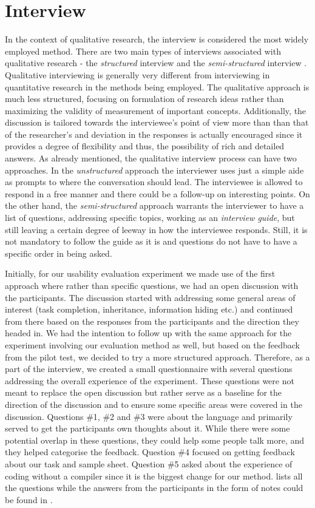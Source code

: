 \section{Interview}
In the context of qualitative research, the interview is considered the most widely employed method. There are two main types of interviews associated with qualitative research - the \textit{structured} interview and the \textit{semi-structured} interview \cite{Bryman}. Qualitative interviewing is generally very different from  interviewing in quantitative research in the methods being employed. The qualitative approach is much less structured, focusing on formulation of research ideas rather than maximizing the validity of measurement of important concepts. Additionally, the discussion is tailored towards the interviewee's point of view more than than that of the researcher's and deviation in the responses is actually encouraged since it provides a degree of flexibility and thus, the possibility of rich and detailed answers. As already mentioned, the qualitative interview process can have two approaches. In the \textit{unstructured} approach the interviewer uses just a simple aide as prompts to where the conversation should lead. The interviewee is allowed to respond in a free manner and there could be a follow-up on interesting points. On the other hand, the \textit{semi-structured} approach warrants the interviewer to have a list of questions, addressing specific topics, working as an \textit{interview guide}, but still leaving a certain degree of leeway in how the interviewee responds. Still, it is not mandatory to follow the guide as it is and questions do not have to have a specific order in being asked. 

Initially, for our usability evaluation experiment we made use of the first approach where rather than specific questions, we had an open discussion with the participants. The discussion started with addressing some general areas of interest (task completion, inheritance, information hiding etc.) and continued from there based on the responses from the participants and the direction they headed in. We had the intention to follow up with the same approach for the experiment involving our evaluation method as well, but based on the feedback from the pilot test, we decided to try a more structured approach. 
Therefore, as a part of the interview, we created a small questionnaire with several questions addressing the overall experience of the experiment.
These questions were not meant to replace the open discussion but rather serve as a baseline for the direction of the discussion and to ensure some specific areas were covered in the discussion.
Questions \#1, \#2 and \#3 were about the language and primarily served to get the participants own thoughts about it.
While there were some potential overlap in these questions, they could help some people talk more, and they helped categorise the feedback.
Question \#4 focused on getting feedback about our task and sample sheet.
Question \#5 asked about the experience of coding without a compiler since it is the biggest change for our method.
 lists all the questions while the answers from the participants in the form of notes could be found in .

